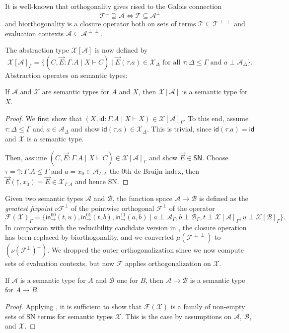 \documentclass[a4paper,USenglish,cleveref, autoref, thm-restate]{lipics-v2019}
\newcommand{\tid}{\mathsf{id}}
\newcommand{\tin}{\ensuremath{\mathsf{in}}}
\newcommand{\inn}[2]{\ensuremath{\tin_{#1}^{#2}}}
\newcommand{\A}{\mathcal{A}}
\newcommand{\B}{\mathcal{B}}
\newcommand{\F}{\mathcal{F}}
\newcommand{\T}{\mathcal{T}}
\newcommand{\X}{\mathcal{X}}
\newcommand{\SN}{\mathsf{SN}}
\newcommand{\up}{\mathord{\uparrow}}
\begin{document}
It is well-known that orthogonality gives rised to the Galois
connection
\[
  \T^\perp \supseteq \A \iff \T \subseteq \A^\perp
\]
and biorthogonality is a closure operator both on sets of terms $\T
\subseteq \T^{\perp\perp}$ and evaluation contexts
$\A \subseteq \A^{\perp\perp}$.

The abstraction type $\X[\A]$ is now defined by
\[
  \X[\A]_\Gamma =
  \{ (C, \vec E : \Gamma.A \mid X \vdash C)
     \mid \vec E (\tau.a) \in \X_\Delta
     \mbox{ for all } \tau : \Delta \leq \Gamma
     \mbox{ and } a \perp \A_\Delta
  \}
  .
\]
Abstraction operates on semantic types:
\begin{lemma}
  \label{lem:absrev}
  If $\A$ and $\X$ are semantic types for $A$ and $X$, then $\X[\A]$
  is a semantic type for $X$.
\end{lemma}
\begin{proof}
  We first show that
  $(X,\tid : \Gamma.A \mid X \vdash X) \in \X[\A]_\Gamma$.
  To this end, assume $\tau : \Delta \leq \Gamma$ and $a \in
  \A_\Delta$ and show $\tid(\tau.a) \in \X_\Delta$.  This is trivial,
  since $\tid(\tau.a) = \tid$ and $\X$ is a semantic type.

  Then, assume $(C, \vec E : \Gamma.A \mid X \vdash C) \in
  \X[\A]_\Gamma$ and show $\vec E \in \SN$.
  Choose $\tau = \up : \Gamma.A \leq \Gamma$ and $a = x_0 \in
  \A_{\Gamma.A}$ the 0th de Bruijn index, then $\vec E (\up,x_0) =
  \vec E \in \X_{\Gamma.A}$ and hence SN.
\end{proof}
Given two semantic types $\A$ and $\B$, the function space $\A \to \B$
is defined as the \emph{greatest fixpoint} $\nu \F^\perp$ of the
pointwise orthogonal $\F^\perp$ of the operator
\[
  \F(\X)_\Gamma =
  \{
    \inn\to{00}(t,u),
    \inn\to{01}(t,b),
    \inn\to{11}(a,b) \mid
      a \perp \A_\Gamma,
      b \perp \B_\Gamma,
      t \perp \X[\A]_\Gamma,
      u \perp \X[\B]_\Gamma
  \}
  .
\]
In comparison with the reducibility candidate version in
, the closure operation has been replaced by
biorthogonality, and we converted $\mu(\F^{\perp\perp})$
to $(\nu(\F^\perp)^\perp)$.  We dropped the outer orthogonalization since
we now compute sets of evaluation contexts, but now $\F$ applies
orthogonalization on $\X$.

\begin{lemma}
  \label{lem:funrev}
  If $\A$ is a semantic type for $A$ and $\B$ one for $B$, then $\A
  \to \B$ is a semantic type for $A \to B$.
\end{lemma}
\begin{proof}
  Applying ,
  it is sufficient to show that $\F(\X)$ is a family of non-empty sets
  of SN terms for semantic types $\X$.
  This is the case by assumptions on $\A$, $\B$, and $\X$.
\end{proof}
\end{document}
